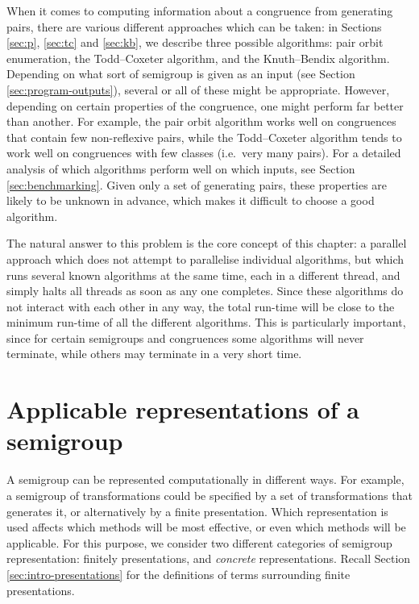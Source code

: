 When it comes to computing information about a congruence from generating pairs,
there are various different approaches which can be taken: in Sections
\ref{sec:p}, \ref{sec:tc} and \ref{sec:kb}, we describe three possible
algorithms: pair orbit enumeration, the Todd--Coxeter algorithm, and the Knuth--Bendix algorithm.
Depending on what sort of semigroup is given as an input (see Section
\ref{sec:program-outputs}), several
or all of these might be appropriate.  However, depending on certain properties
of the congruence, one might perform far better than another.  For example, the
pair orbit algorithm works well on congruences that contain few non-reflexive
pairs, while the Todd--Coxeter algorithm tends to work well on congruences with
few classes (i.e.~very many pairs).  For a detailed analysis of which algorithms
perform well on which inputs, see Section \ref{sec:benchmarking}.  Given
only a set of generating pairs, these properties are likely to be unknown in
advance, which makes it difficult to choose a good algorithm.

The natural answer to this problem is the core concept of this chapter: a
parallel approach which does not attempt to parallelise individual algorithms,
but which runs several known algorithms at the same time, each in a different
thread, and simply halts all threads as soon as any one completes.  Since these
algorithms do not interact with each other in any way, the total run-time will
be close to the minimum run-time of all the different algorithms.  This is
particularly important, since for certain semigroups and congruences some
algorithms will never terminate, while others may terminate in a very short
time.

\section{Applicable representations of a semigroup}
\label{sec:applicable-representations-of-a-semigroup}

A semigroup can be represented computationally in different ways.  For example,
a semigroup of transformations could be specified by a set of transformations
that generates it, or alternatively by a finite presentation.
Which representation is used affects which methods will be most effective,
or even which methods will be applicable.  For this purpose, we consider two
different categories of semigroup representation: finitely presentations, and
\textit{concrete} representations.  Recall Section \ref{sec:intro-presentations} for
the definitions of terms surrounding finite presentations.

